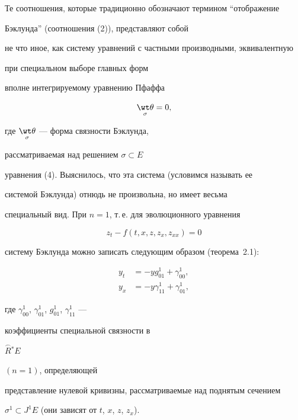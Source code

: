 Те соотношения, которые традиционно обозначают термином ``отображение 


Бэклунда'' (соотношения (2)), представляют собой


не что иное, как систему уравнений с частными производными, эквивалентную 


при специальном выборе главных форм


вполне интегрируемому уравнению Пфаффа


$$


\underset{\sigma}{\wt \theta}=0,


$$


где $\underset{\sigma}{\wt \theta}$ --- форма связности Бэклунда, 


рассматриваемая над решением $\sigma \subset E$


уравнения (4). Выяснилось, что эта система (условимся называть ее 


системой Бэклунда) отнюдь не произвольна, но имеет весьма 


специальный вид. При $n=1$, т.\,е. для эволюционного уравнения


\begin{equation}


z_t-f ({t,x,z,z_x,z_{xx}})=0


\end{equation}


систему Бэклунда можно записать следующим образом (теорема~2.1):


\begin{equation}


\begin{split}


y_t&=- y g_{01}^1+\gamma_{00}^1, \\


y_x&=- y \gamma_{11}^1+\gamma_{01}^1,


\end{split}


\end{equation}


где $\gamma_{00}^1$, $\gamma_{01}^1$, $g_{01}^1$, $\gamma_{11}^1$ --- 


коэффициенты специальной связности в


$\overset{\frown}{R}{}^* E$ 


$({n=1})$, определяющей 


представление нулевой кривизны, рассматриваемые над поднятым сечением


$\sigma^1 \subset J^1 E$ (они зависят от $t$, $x$, $z$, $z_x$).





